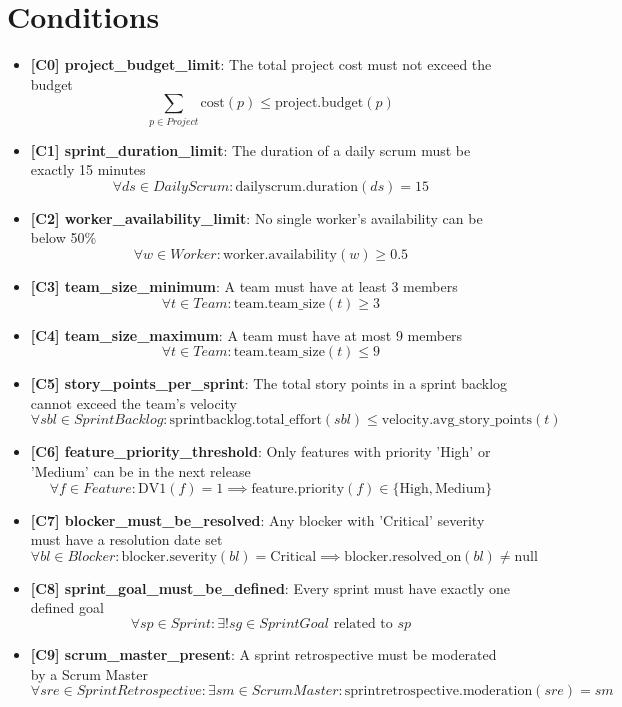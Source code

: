 \documentclass{article}
\begin{document}
\section{Conditions}
\begin{itemize}
    \item \textbf{[C0] project\_budget\_limit}: The total project cost must not exceed the budget
        \[ \sum_{p \in Project} \text{cost}(p) \leq \text{project.budget}(p) \]
    \item \textbf{[C1] sprint\_duration\_limit}: The duration of a daily scrum must be exactly 15 minutes
        \[ \forall ds \in DailyScrum: \text{dailyscrum.duration}(ds) = 15 \]
    \item \textbf{[C2] worker\_availability\_limit}: No single worker's availability can be below 50\%
        \[ \forall w \in Worker: \text{worker.availability}(w) \geq 0.5 \]
    \item \textbf{[C3] team\_size\_minimum}: A team must have at least 3 members
        \[ \forall t \in Team: \text{team.team\_size}(t) \geq 3 \]
    \item \textbf{[C4] team\_size\_maximum}: A team must have at most 9 members
        \[ \forall t \in Team: \text{team.team\_size}(t) \leq 9 \]
    \item \textbf{[C5] story\_points\_per\_sprint}: The total story points in a sprint backlog cannot exceed the team's velocity
        \[ \forall sbl \in SprintBacklog: \text{sprintbacklog.total\_effort}(sbl) \leq \text{velocity.avg\_story\_points}(t) \]
    \item \textbf{[C6] feature\_priority\_threshold}: Only features with priority 'High' or 'Medium' can be in the next release
        \[ \forall f \in Feature: \text{DV1}(f) = 1 \implies \text{feature.priority}(f) \in \{\text{High}, \text{Medium}\} \]
    \item \textbf{[C7] blocker\_must\_be\_resolved}: Any blocker with 'Critical' severity must have a resolution date set
        \[ \forall bl \in Blocker: \text{blocker.severity}(bl) = \text{Critical} \implies \text{blocker.resolved\_on}(bl) \neq \text{null} \]
    \item \textbf{[C8] sprint\_goal\_must\_be\_defined}: Every sprint must have exactly one defined goal
        \[ \forall sp \in Sprint: \exists! sg \in SprintGoal \text{ related to } sp \]
    \item \textbf{[C9] scrum\_master\_present}: A sprint retrospective must be moderated by a Scrum Master
        \[ \forall sre \in SprintRetrospective: \exists sm \in ScrumMaster: \text{sprintretrospective.moderation}(sre) = sm \]
\end{itemize}
\end{document}
